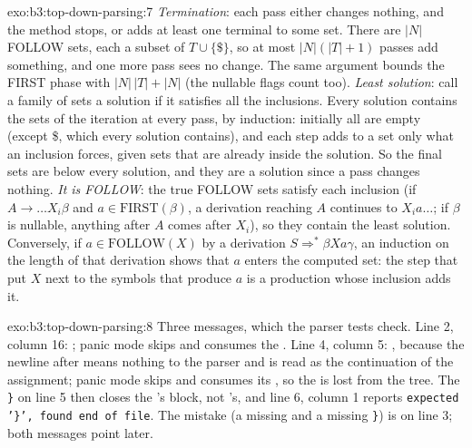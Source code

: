 \begin{solution}{exo:b3:top-down-parsing:7}
\emph{Termination}: each pass either changes nothing, and the method stops, or adds at least one terminal to some set. There are $|N|$ FOLLOW sets, each a subset of $T \cup \{\$\}$, so at most $|N|(|T| + 1)$ passes add something, and one more pass sees no change. The same argument bounds the FIRST phase with $|N|\,|T| + |N|$ (the nullable flags count too). \emph{Least solution}: call a family of sets a solution if it satisfies all the inclusions. Every solution contains the sets of the iteration at every pass, by induction: initially all are empty (except \$, which every solution contains), and each step adds to a set only what an inclusion forces, given sets that are already inside the solution. So the final sets are below every solution, and they are a solution since a pass changes nothing. \emph{It is FOLLOW}: the true FOLLOW sets satisfy each inclusion (if $A \to \dots X_i \beta$ and $a \in \mathrm{FIRST}(\beta)$, a derivation reaching $A$ continues to $X_i a\dots$; if $\beta$ is nullable, anything after $A$ comes after $X_i$), so they contain the least solution. Conversely, if $a \in \mathrm{FOLLOW}(X)$ by a derivation $S \Rightarrow^* \beta X a \gamma$, an induction on the length of that derivation shows that $a$ enters the computed set: the step that put $X$ next to the symbols that produce $a$ is a production whose inclusion adds it.
\end{solution}

\begin{solution}{exo:b3:top-down-parsing:8}
Three messages, which the parser tests check. Line 2, column 16: ; panic mode skips  and consumes the \code{;}. Line 4, column 5: , because the newline after  means nothing to the parser and  is read as the continuation of the assignment; panic mode skips  and consumes its \code{;}, so the  is lost from the tree. The \texttt{\}} on line 5 then closes the 's block, not 's, and line 6, column 1 reports \texttt{expected '\}', found end of file}. The mistake (a missing \code{;} and a missing \texttt{\}}) is on line 3; both messages point later.
\end{solution}

